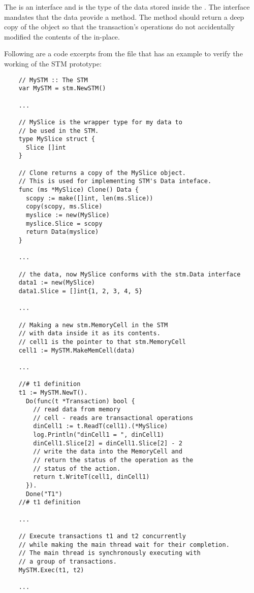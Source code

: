 \documentclass[../main]{subfiles}
\begin{document}
  \par
  The  is an interface and is the type of the data stored inside the . The interface mandates that the data provide a  method. The  method should return a deep copy of the object so that the transaction's operations do not accidentally modified the contents of the  in-place. \par

  Following are a code excerpts from the  file that has an example to verify the working of the STM prototype:

  \begin{lstlisting}
    // MySTM :: The STM
    var MySTM = stm.NewSTM()

    ...

    // MySlice is the wrapper type for my data to 
    // be used in the STM.
    type MySlice struct {
      Slice []int
    }
    
    // Clone returns a copy of the MySlice object. 
    // This is used for implementing STM's Data inteface.
    func (ms *MySlice) Clone() Data {
      scopy := make([]int, len(ms.Slice))
      copy(scopy, ms.Slice)
      myslice := new(MySlice)
      myslice.Slice = scopy
      return Data(myslice)
    }
    
    ...

    // the data, now MySlice conforms with the stm.Data interface
    data1 := new(MySlice)
    data1.Slice = []int{1, 2, 3, 4, 5}

    ...

    // Making a new stm.MemoryCell in the STM
    // with data inside it as its contents.
    // cell1 is the pointer to that stm.MemoryCell
    cell1 := MySTM.MakeMemCell(data)

    ...

    //# t1 definition
    t1 := MySTM.NewT().
      Do(func(t *Transaction) bool {
        // read data from memory 
        // cell - reads are transactional operations
        dinCell1 := t.ReadT(cell1).(*MySlice)
        log.Println("dinCell1 = ", dinCell1)
        dinCell1.Slice[2] = dinCell1.Slice[2] - 2
        // write the data into the MemoryCell and
        // return the status of the operation as the
        // status of the action.
        return t.WriteT(cell1, dinCell1)
      }).
      Done("T1")
    //# t1 definition

    ...

    // Execute transactions t1 and t2 concurrently
    // while making the main thread wait for their completion.
    // The main thread is synchronously executing with 
    // a group of transactions.
    MySTM.Exec(t1, t2)

    ...


  \end{lstlisting}
\end{document}
